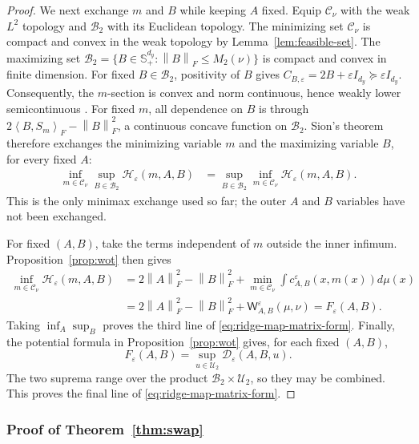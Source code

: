 \documentclass[11pt]{article}
\newcommand{\cU}{\mathcal U}
\newcommand{\ip}[2]{\left\langle #1,#2\right\rangle}
\newcommand{\norm}[1]{\left\lVert #1\right\rVert}
\theoremstyle{plain}
\theoremstyle{definition}
\theoremstyle{remark}
\begin{document}
\begin{proof}
We next exchange $m$ and $B$ while keeping $A$ fixed.  Equip
$\mathcal C_\nu$ with the weak $L^2$ topology and
$\mathcal B_2$ with its Euclidean topology.  The minimizing set
$\mathcal C_\nu$ is compact and convex in the weak topology by
Lemma~\ref{lem:feasible-set}.  The maximizing set
$\mathcal B_2=\{B\in\mathbb S_+^{d_y}:\norm B_F\le M_2(\nu)\}$ is compact and
convex in finite dimension.  For fixed $B\in\mathcal B_2$, positivity of $B$
gives
$C_{B,\varepsilon}=2B+\varepsilon I_{d_y}\succeq\varepsilon I_{d_y}$.
Consequently, the $m$-section is convex and norm continuous, hence weakly lower
semicontinuous \cite[Corollary~3.9]{BrezisFA}.  For fixed $m$, all dependence on
$B$ is through
$2\ip{B}{S_m}_F-\norm B_F^2$, a continuous concave function on
$\mathcal B_2$.  Sion's theorem \cite{Sion} therefore exchanges the minimizing
variable $m$ and the maximizing variable $B$, for every fixed $A$:
\begin{align*}
 \inf_{m\in\mathcal C_\nu}\sup_{B\in\mathcal B_2}
 \mathcal H_\varepsilon(m,A,B)
 &=\sup_{B\in\mathcal B_2}\inf_{m\in\mathcal C_\nu}
 \mathcal H_\varepsilon(m,A,B).
\end{align*}
This is the only minimax exchange used so far; the outer $A$ and $B$ variables
have not been exchanged.

For fixed $(A,B)$, take the terms independent of $m$ outside the inner
infimum.  Proposition~\ref{prop:wot} then gives
\begin{align*}
 \inf_{m\in\mathcal C_\nu}\mathcal H_\varepsilon(m,A,B)
 &=2\norm A_F^2-\norm B_F^2
   +\min_{m\in\mathcal C_\nu}
     \int c_{A,B}^\varepsilon(x,m(x))d\mu(x)\\
 &=2\norm A_F^2-\norm B_F^2
   +\mathsf W_{A,B}^\varepsilon(\mu,\nu)
 =F_\varepsilon(A,B).
\end{align*}
Taking $\inf_A\sup_B$ proves the third line of
\eqref{eq:ridge-map-matrix-form}.  Finally, the potential formula in
Proposition~\ref{prop:wot} gives, for each fixed $(A,B)$,
\[
 F_\varepsilon(A,B)
 =\sup_{u\in\cU_2}\mathcal D_\varepsilon(A,B,u).
\]
The two suprema range over the product $\mathcal B_2\times\cU_2$, so they may
be combined.  This proves the final line of
\eqref{eq:ridge-map-matrix-form}.
\end{proof}

\subsubsection{Proof of Theorem~\ref{thm:swap}}\label{proof:8.4}
\end{document}

